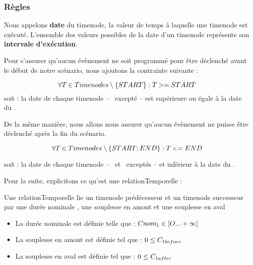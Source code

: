 \subsubsection{Règles}%

\setcounter{equation}{0}
Nous appelons \textbf{date} du \gls{timenode}, la valeur de temps à laquelle une \gls{timenode} est exécuté. L'ensemble des valeurs possibles de la date d'un \gls{timenode} représente son \textbf{intervale d'exécution}.

Pour s'assurer qu'aucun évènement ne soit programmé pour être déclenché avant le début de notre scénario, nous ajoutons la contrainte suivante :

\begin{equation}
    \forall T_{} \in Timenodes \setminus \{ START \} : T_{} >= START
\end{equation}
soit : la date de chaque \gls{timenode} -- \startNode~excepté -- est supérieure ou égale à la date du \startNode.

De la même manière, nous allons nous assurer qu'aucun évènement ne puisse être déclenché après la fin du scénario.

\begin{equation}
    \forall T_{} \in Timenodes \setminus \{ START; END \} : T_{} <= END
\end{equation}

soit : la date de chaque \gls{timenode} -- \startNode~et \finalNode~exceptés -- et inférieur à la date du \finalNode.

Pour la suite, explicitons ce qu'est une \gls{relationTemporelle} :

Une \gls{relationTemporelle}  lie un \gls{timenode}  prédécesseur et un \gls{timenode}  successeur par une durée nominale , une souplesse en amont  et une souplesse en aval 
\begin{itemize}
    \item La durée nominale est définie telle que : $ Cnom_{1} \in \left [ O ... +\infty \right [ $
    \item La souplesse en amont  est définie tel que : $ 0 \leq C_{1before} $
    \item La souplesse en aval  est définie tel que : $ 0 \leq C_{1after} $
\end{itemize}

